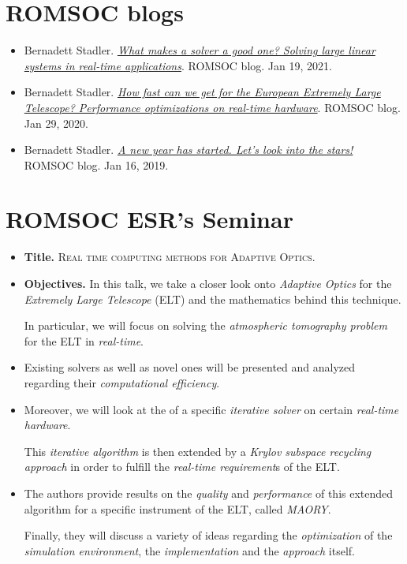 \documentclass{book}
\numberwithin{equation}{section}
\begin{document}
\section{ROMSOC blogs}
\begin{itemize}
    \item Bernadett Stadler. \href{https://www.romsoc.eu/what-makes-a-solver-a-good-one/}{\textit{What makes a solver a good one? Solving large linear systems in real-time applications}}. ROMSOC blog. Jan 19, 2021.
    \item Bernadett Stadler. \href{https://www.romsoc.eu/how-fast-can-we-get-for-the-european-extremely-large-telescope-performance-optimizations-on-real-time-hardware/}{\textit{How fast can we get for the European Extremely Large Telescope? Performance optimizations on real-time hardware}}. ROMSOC blog. Jan 29, 2020.
    \item Bernadett Stadler. \href{https://www.romsoc.eu/a-new-year-has-started-lets-look-into-the-stars/}{\textit{A new year has started. Let's look into the stars!}} ROMSOC blog. Jan 16, 2019.
\end{itemize}

\section{ROMSOC ESR's Seminar}
\begin{itemize}
    \item \textbf{Title.} \textsc{Real time computing methods for Adaptive Optics.}
    \item \textbf{Objectives.} In this talk, we take a closer look onto \textit{Adaptive Optics} for the \textit{Extremely Large Telescope} (ELT) and the mathematics behind this technique.
    
    In particular, we will focus on solving the \textit{atmospheric tomography problem} for the ELT in \textit{real-time}.
    \item Existing solvers as well as novel ones will be presented and analyzed regarding their \textit{computational efficiency}.
    \item Moreover, we will look at the  of a specific \textit{iterative solver} on certain \textit{real-time hardware}.
    
    This \textit{iterative algorithm} is then extended by a \textit{Krylov subspace recycling approach} in order to fulfill the \textit{real-time requirement}s of the ELT.
    \item The authors provide results on the \textit{quality} and \textit{performance} of this extended algorithm for a specific instrument of the ELT, called \textit{MAORY}.
    
    Finally, they will discuss a variety of ideas regarding the \textit{optimization} of the \textit{simulation environment}, the \textit{implementation} and the \textit{approach} itself.
\end{itemize}
\end{document}
